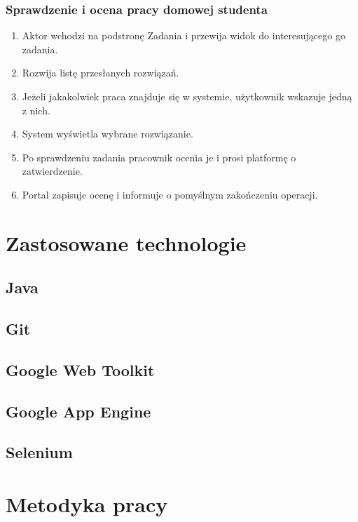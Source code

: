 \documentclass{pracamgr}
\begin{document}
\subsection{Sprawdzenie i ocena pracy domowej studenta}

\begin{enumerate}
   \item Aktor wchodzi na podstronę Zadania i przewija widok do interesującego
      go zadania.
   \item Rozwija listę przesłanych rozwiązań.
   \item Jeżeli jakakolwiek praca znajduje się w systemie, użytkownik wskazuje 
      jedną z nich.
   \item System wyświetla wybrane rozwiązanie.
   \item Po sprawdzeniu zadania pracownik ocenia je i prosi platformę o 
      zatwierdzenie.
   \item Portal zapisuje ocenę i informuje o pomyślnym zakończeniu operacji.
\end{enumerate}

%
%
\chapter{Zastosowane technologie}

\section{Java}
\section{Git}
\section{Google Web Toolkit}
\section{Google App Engine}
\section{Selenium}

%
%
\chapter{Metodyka pracy}
\end{document}

